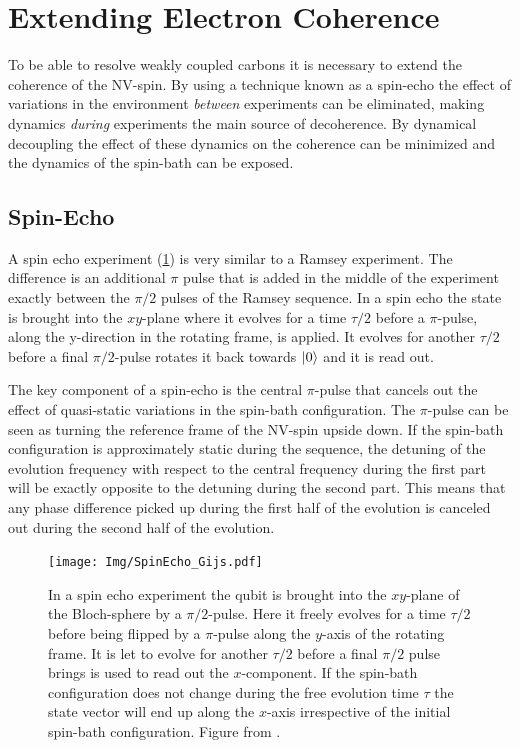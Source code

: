 \section{Extending Electron Coherence}

To be able to resolve weakly coupled carbons it is necessary to extend the coherence of the NV-spin.
By using a technique known as a spin-echo the effect of variations in the environment \emph{between} experiments can be eliminated, making dynamics \emph{during} experiments the main source of decoherence.
By dynamical decoupling the effect of these dynamics on the coherence can be minimized and the dynamics of the spin-bath can be exposed.


\subsection{Spin-Echo}

A spin echo experiment (\cref{fig:spin_echo_gijs}) is very similar to a Ramsey experiment.
The difference is an additional $\pi$ pulse that is added in the middle of the experiment exactly between the $\pi/2$ pulses of the Ramsey sequence.
In a spin echo the state is brought into the $xy$-plane where it evolves for a time $\tau/2$ before a $\pi$-pulse, along the y-direction in the rotating frame, is applied.
It evolves for another $\tau/2$ before a final $\pi/2$-pulse rotates it back towards ${\left\vert{0}\right\rangle}$ and it is read out.

The key component of a spin-echo is the central $\pi$-pulse that cancels out the effect of quasi-static variations in the spin-bath configuration.
The $\pi$-pulse can be seen as turning the reference frame of the NV-spin upside down.
If the spin-bath configuration is approximately static during the sequence, the detuning of the evolution frequency with respect to the central frequency during the first part will be exactly opposite to the detuning during the second part.
This means that any phase difference picked up during the first half of the evolution is canceled out during the second half of the evolution.
\begin{figure}[htbp]
    \centering
    \texttt{[image: Img/SpinEcho\_Gijs.pdf]}
    \caption{In a spin echo experiment the qubit is brought into the $xy$-plane of the Bloch-sphere by a $\pi/2$-pulse. Here it freely evolves for a time $\tau/2$ before being flipped by a $\pi$-pulse along the $y$-axis of the rotating frame. It is let to evolve for another $\tau/2$ before a final $\pi/2$ pulse brings is used to read out the $x$-component.
    If the spin-bath configuration does not change during the free evolution time $\tau$ the state vector will end up along the $x$-axis irrespective of the initial spin-bath configuration.
    Figure from \citet{Lange2012Quantum}. }
    \label{fig:spin_echo_gijs}
\end{figure}


